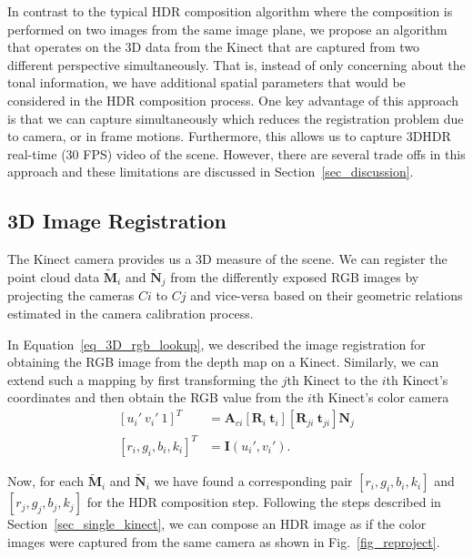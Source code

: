 In contrast to the typical HDR composition algorithm where the composition is performed on two images from the same image plane, we propose an algorithm that operates on the 3D data from the Kinect that are captured from two different perspective simultaneously. That is, instead of only concerning about the tonal information, we have additional spatial parameters that would be considered in the HDR composition process.  One key advantage of this approach is that we can capture simultaneously which reduces the registration problem due to camera, or in frame motions. Furthermore, this allows us to capture 3DHDR real-time (30 FPS) video of the scene. However, there are several trade offs in this approach and these limitations are discussed in Section~\ref{sec_discussion}.

\subsection{3D Image Registration}
The Kinect camera provides us a 3D measure of the scene. We can register the point cloud data $\mathbf{\tilde{M}}_{i}$ and $\mathbf{\tilde{N}}_{j}$
 from the differently exposed RGB images by projecting the cameras $Ci$ to $Cj$ and vice-versa based on their geometric relations estimated in the camera calibration process.

In Equation~\ref{eq_3D_rgb_lookup}, we described the image registration for obtaining the RGB image from the depth map on a Kinect. Similarly, we can extend such a mapping by first transforming the $j$th Kinect to the $i$th Kinect's coordinates and then obtain the RGB value from the $i$th Kinect's color camera 
\begin{equation}
\begin{split}
[u_i'~v_i'~1]^T &=  \mathbf{A}_{ci}[\mathbf{R}_i~\mathbf{t}_i][\mathbf{R}_{ji}~\mathbf{t}_{ji}]\mathbf{N}_j\\
[r_i, g_i, b_i, k_i]^T &= \mathbf{I}(u_i', v_i').
\label{eq_3D_rgb_lookup_ir}
\end{split}
\end{equation}

Now, for each $\mathbf{\tilde{M}}_{i}$ and $\mathbf{\tilde{N}}_{i}$ we have found a corresponding pair $[r_i, g_i, b_i, k_i]$ and $[r_j, g_j, b_j, k_j]$ for the HDR composition step.  Following the steps described in Section~\ref{sec_single_kinect}, we can compose an HDR image as if the color images were captured from the same camera as shown in Fig.~\ref{fig_reproject}.

